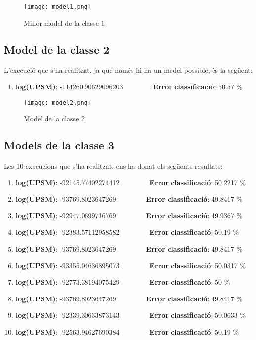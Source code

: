 \documentclass[../informe.tex]{subfiles}
\begin{document}
    \begin{figure}[H]
        \centering
        \texttt{[image: model1.png]}
        \caption{Millor model de la classe 1}
        \label{fig:model1}
    \end{figure}

    \medskip
    \subsection{Model de la classe 2}
    L'execució que s'ha realitzat, ja que només hi ha un model possible, és la següent:
    \begin{enumerate}
        \item \textbf{log(UPSM)}: -114260.90629096203 \ \ \ \ \ \ \ \ \textbf{Error classificació}: 50.57 \%
    \end{enumerate}

    \begin{figure}[H]
        \centering
        \texttt{[image: model2.png]}
        \caption{Model de la classe 2}
        \label{fig:model2}
    \end{figure}

    \medskip
    \subsection{Models de la classe 3}
    Les 10 execucions que s'ha realitzat, ens ha donat els següents resultats:
    \begin{enumerate}
        \item \textbf{log(UPSM)}: -92145.77402274412 \ \ \ \ \ \ \ \ \textbf{Error classificació}: 50.2217 \%
        \item \textbf{log(UPSM)}: -93769.8023647269 \ \ \ \ \ \ \ \ \textbf{Error classificació}: 49.8417 \%
        \item \textbf{log(UPSM)}: -92947.0699716769 \ \ \ \ \ \ \ \ \textbf{Error classificació}: 49.9367 \%
        \item \textbf{log(UPSM)}: -92383.57112958582 \ \ \ \ \ \ \ \ \textbf{Error classificació}: 50.19 \%
        \item \textbf{log(UPSM)}: -93769.8023647269 \ \ \ \ \ \ \ \ \textbf{Error classificació}: 49.8417 \%
        \item \textbf{log(UPSM)}: -93355.04636895073 \ \ \ \ \ \ \ \ \textbf{Error classificació}: 50.0317 \%
        \item \textbf{log(UPSM)}: -92773.38194075429 \ \ \ \ \ \ \ \ \textbf{Error classificació}: 50 \%
        \item \textbf{log(UPSM)}: -93769.8023647269 \ \ \ \ \ \ \ \ \textbf{Error classificació}: 49.8417 \%
        \item \textbf{log(UPSM)}: -92339.30633873143 \ \ \ \ \ \ \ \ \textbf{Error classificació}: 50.0633 \%
        \item \textbf{log(UPSM)}: -92563.94627690384 \ \ \ \ \ \ \ \ \textbf{Error classificació}: 50.19 \%
    \end{enumerate}
\end{document}
